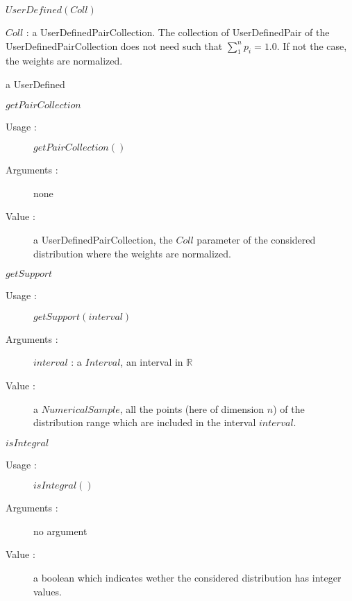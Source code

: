 \begin{description}

\item[Usage :] $UserDefined(Coll)$

\item[Arguments :]  $Coll$ : a UserDefinedPairCollection. The collection of UserDefinedPair of the UserDefinedPairCollection does not need such that $\sum_1^n  p_i = 1.0$. If not the case, the weights are normalized.

\item[Value :] a UserDefined

\item[Some methods :]  \rule{0pt}{1em}
  \begin{description}


  \item $getPairCollection$
    \begin{description}
    \item[Usage :] $getPairCollection()$
    \item[Arguments :] none
    \item[Value :]  a UserDefinedPairCollection, the  $Coll$ parameter of the considered distribution where the weights are normalized.
    \end{description}
    \bigskip

  \item $getSupport$
    \begin{description}
    \item[Usage :] $getSupport(interval)$
    \item[Arguments :] $interval$ : a $Interval$, an interval in $\mathbb{R}$
    \item[Value :]  a $NumericalSample$, all the points (here of dimension $n$) of the distribution range which are included in the interval $interval$.
    \end{description}
    \bigskip

  \item $isIntegral$
    \begin{description}
    \item[Usage :] $isIntegral()$
    \item[Arguments :] no argument
    \item[Value :] a boolean which indicates wether the considered distribution has integer values.
    \end{description}

  \end{description}


\end{description}
